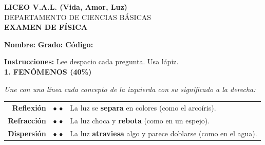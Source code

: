 \documentclass[12pt, letterpaper]{article}
\begin{document}
\vspace*{0.5cm}

\begin{center}
    {\Large \textbf{LICEO V.A.L. (Vida, Amor, Luz)}}\\[0.1cm]
    {\large DEPARTAMENTO DE CIENCIAS BÁSICAS}\\[0.1cm]
    \textbf{EXAMEN DE FÍSICA}\\[0.1cm]
\end{center}

\vspace{0.3cm}
\noindent \textbf{Nombre:} \underline{\hspace{8cm}} \textbf{Grado:} \underline{\hspace{2cm}}\textbf{Código:} \underline{\hspace{2cm}}

\vspace{0.5cm}
\noindent \textbf{Instrucciones:} Lee despacio cada pregunta. Usa lápiz.\\



\noindent \textbf{\textcolor{valblue}{1. FENÓMENOS (40\%)}}

\vspace{0.2cm}
\noindent \textit{Une con una línea cada concepto de la izquierda con su significado a la derecha:}

\vspace{0.2cm}
\begin{center}
    \renewcommand{\arraystretch}{2}
    \begin{tabular}{r c l}
        \textbf{Reflexión} & \hspace{0.5cm} $\bullet$ \hspace{2cm} $\bullet$ \hspace{0.5cm} & La luz se \textbf{separa} en colores (como el arcoíris). \\[0.2cm]
        \textbf{Refracción}   & \hspace{0.5cm} $\bullet$ \hspace{2cm} $\bullet$ \hspace{0.5cm} & La luz choca y \textbf{rebota} (como en un espejo). \\[0.2cm]
        \textbf{Dispersión}    & \hspace{0.5cm} $\bullet$ \hspace{2cm} $\bullet$ \hspace{0.5cm} & La luz \textbf{atraviesa} algo y parece doblarse (como en el agua).
    \end{tabular}
\end{center}
\end{document}
